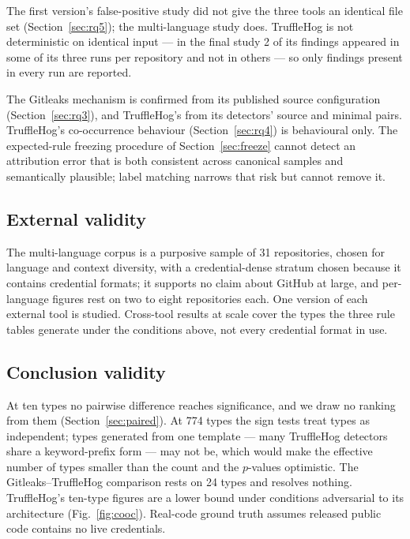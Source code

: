 \documentclass[pdflatex,sn-basic]{sn-jnl}
\begin{document}
The first version's false-positive study did not give the three tools an identical file set (Section~\ref{sec:rq5}); the multi-language study does. TruffleHog is not deterministic on identical input --- in the final study 2 of its findings appeared in some of its three runs per repository and not in others --- so only findings present in every run are reported.

The Gitleaks mechanism is confirmed from its published source configuration (Section~\ref{sec:rq3}), and TruffleHog's from its detectors' source and minimal pairs. TruffleHog's co-occurrence behaviour (Section~\ref{sec:rq4}) is behavioural only. The expected-rule freezing procedure of Section~\ref{sec:freeze} cannot detect an attribution error that is both consistent across canonical samples and semantically plausible; label matching narrows that risk but cannot remove it.

\subsection{External validity}

The multi-language corpus is a purposive sample of 31 repositories, chosen for language and context diversity, with a credential-dense stratum chosen because it contains credential formats; it supports no claim about GitHub at large, and per-language figures rest on two to eight repositories each. One version of each external tool is studied. Cross-tool results at scale cover the types the three rule tables generate under the conditions above, not every credential format in use.

\subsection{Conclusion validity}

At ten types no pairwise difference reaches significance, and we draw no ranking from them (Section~\ref{sec:paired}). At 774 types the sign tests treat types as independent; types generated from one template --- many TruffleHog detectors share a keyword-prefix form --- may not be, which would make the effective number of types smaller than the count and the $p$-values optimistic. The Gitleaks--TruffleHog comparison rests on 24 types and resolves nothing. TruffleHog's ten-type figures are a lower bound under conditions adversarial to its architecture (Fig.~\ref{fig:cooc}). Real-code ground truth assumes released public code contains no live credentials.
\end{document}
